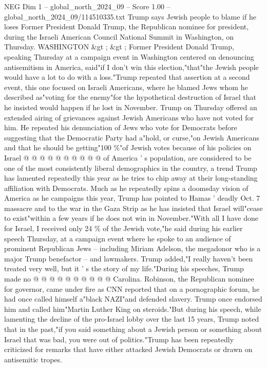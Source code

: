 \begin{textsample}{NEG Dim 1 – global\_north\_2024\_09 – Score 1.00 – global\_north\_2024\_09/114510335.txt}  \label{ex:f1_neg_027}
Trump says Jewish people to blame if he loses Former President Donald Trump, the Republican nominee for president, during the Israeli American Council National Summit in Washington, on Thursday.
WASHINGTON \&gt ; \&gt ; Former President Donald Trump, speaking Thursday at a campaign event in Washington centered on denouncing antisemitism in America, said"if I don't win this election,"that"the Jewish people would have a lot to do with a loss."Trump repeated that assertion at a second event, this one focused on Israeli Americans, where he blamed Jews whom he described as"voting for the enemy"for the hypothetical destruction of Israel that he insisted would happen if he lost in November.
Trump on Thursday offered an extended airing of grievances against Jewish Americans who have not voted for him.
He repeated his denunciation of Jews who vote for Democrats before suggesting that the Democratic Party had a"hold, or curse,"on Jewish Americans and that he should be getting"100 \%"of Jewish votes because of his policies on Israel @ @ @ @ @ @ @ @ @ @ of America ' s population, are considered to be one of the most consistently liberal demographics in the country, a trend Trump has lamented repeatedly this year as he tries to chip away at their long-standing affiliation with Democrats.
Much as he repeatedly spins a doomsday vision of America as he campaigns this year, Trump has pointed to Hamas ' deadly Oct. 7 massacre and to the war in the Gaza Strip as he has insisted that Israel will"cease to exist"within a few years if he does not win in November."With all I have done for Israel, I received only 24 \% of the Jewish vote,"he said during his earlier speech Thursday, at a campaign event where he spoke to an audience of prominent Republican Jews -- including Miriam Adelson, the megadonor who is a major Trump benefactor -- and lawmakers.
Trump added,"I really haven't been treated very well, but it ' s the story of my life."During his speeches, Trump made no @ @ @ @ @ @ @ @ @ @ Carolina.
Robinson, the Republican nominee for governor, came under fire as CNN reported that on a pornographic forum, he had once called himself a"black NAZI"and defended slavery.
Trump once endorsed him and called him"Martin Luther King on steroids."But during his speech, while lamenting the decline of the pro-Israel lobby over the last 15 years, Trump noted that in the past,"if you said something about a Jewish person or something about Israel that was bad, you were out of politics."Trump has been repeatedly criticized for remarks that have either attacked Jewish Democrats or drawn on antisemitic tropes.

\end{textsample}
